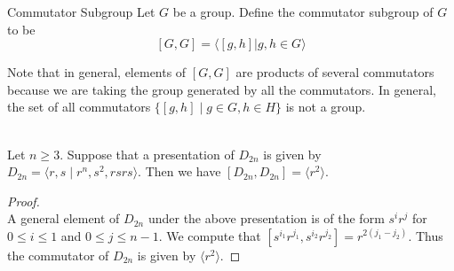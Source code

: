 \documentclass[a4paper]{article}
\begin{document}
\begin{defn}{Commutator Subgroup}{} Let $G$ be a group. Define the commutator subgroup of $G$ to be $$[G,G]=\langle [g,h]|g,h\in G\rangle$$
\end{defn}

Note that in general, elements of $[G,G]$ are products of several commutators because we are taking the group generated by all the commutators. In general, the set of all commutators $\{[g,h]\;|\;g\in G, h\in H\}$ is not a group. 

\begin{eg}{}{}\\
Let $n\geq 3$. Suppose that a presentation of $D_{2n}$ is given by $D_{2n}=\langle r,s\;|\;r^n, s^2, rsrs\rangle$. Then we have $[D_{2n},D_{2n}]=\langle r^2\rangle$. 
\begin{proof}\\
A general element of $D_{2n}$ under the above presentation is of the form $s^ir^j$ for $0\leq i\leq 1$ and $0\leq j\leq n-1$. We compute that $[s^{i_1}r^{j_1},s^{i_2}r^{j_2}]=r^{2(j_1-j_2)}$. Thus the commutator of $D_{2n}$ is given by $\langle r^2\rangle$. 
\end{proof}
\end{eg}
\end{document}
